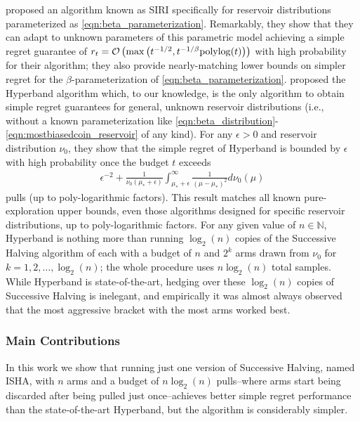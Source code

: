 \citet{DBLP:journals/corr/CarpentierV15} proposed an algorithm 
known as SIRI
specifically for  reservoir distributions parameterized as \eqref{eqn:beta_parameterization}.
Remarkably, they show that they can adapt to unknown parameters of this parametric model achieving a simple regret guarantee of  $r_t=\mathcal{O}\left( \max\left(t^{-1/2}, t^{-1/\beta}{\rm polylog}(t)\right)\right)$ with high probability for their algorithm; they also provide nearly-matching lower bounds on simpler regret for the $\beta$-parameterization of \eqref{eqn:beta_parameterization}.
\citet{li2017hyperband} proposed the Hyperband algorithm which, to our knowledge, is the only algorithm to obtain simple regret guarantees for general, unknown reservoir distributions (i.e., without a known parameterization like \eqref{eqn:beta_distribution}-\eqref{eqn:mostbiasedcoin_reservoir} of any kind).
For any $\epsilon>0$ and reservoir distribution $\nu_0$, they show that the simple regret of Hyperband is bounded by $\epsilon$ with high probability once the budget $t$ exceeds 
\begin{align}\label{eqn:rough_sample_complexity}
\epsilon^{-2} + \tfrac{1}{\nu_0(\mu_* + \epsilon)}\int_{\mu_*+\epsilon}^\infty \tfrac{1}{(\mu-\mu_*)^2} d\nu_0(\mu)
\end{align}
pulls (up to poly-logarithmic factors).
This result matches all known pure-exploration upper bounds, even those algorithms designed for specific reservoir distributions, up to poly-logarithmic factors.
For any given value of $n \in \mathbb{N}$, Hyperband is nothing more than running $\log_2(n)$ copies of the Successive Halving algorithm of \cite{icml2013_karnin13} each with a budget of $n$ and $2^k$ arms drawn from $\nu_0$ for $k=1,2,\dots,\log_2(n)$; the whole procedure uses $n \log_2(n)$ total samples. 
While Hyperband is state-of-the-art, hedging over these $\log_2(n)$ copies of Successive Halving is inelegant, and empirically it was almost always observed that the most aggressive bracket with the most arms worked best. 


\subsubsection{Main Contributions}
In this work we show that running just one version of Successive Halving, named ISHA, with $n$ arms and a budget of $n\log_2(n)$ pulls--where arms start being discarded after being pulled just once--achieves better simple regret performance than the state-of-the-art Hyperband, but the algorithm is considerably simpler.

